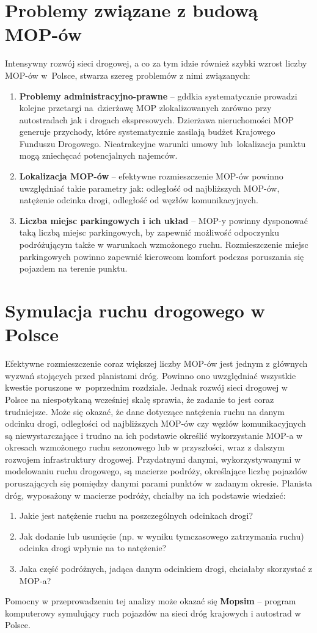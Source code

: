 \section{Problemy związane z budową MOP-ów}
Intensywny rozwój sieci drogowej, a co za tym idzie również szybki wzrost liczby MOP-ów w~Polsce, stwarza szereg problemów z nimi związanych:
\begin{enumerate}
    \item \textbf{Problemy administracyjno-prawne} -- \acrshort{gddkia} systematycznie prowadzi kolejne przetargi na~dzierżawę MOP zlokalizowanych zarówno przy autostradach jak i drogach ekspresowych. Dzierżawa nieruchomości MOP generuje przychody, które systematycznie zasilają budżet Krajowego Funduszu Drogowego. Nieatrakcyjne warunki umowy lub~lokalizacja punktu mogą zniechęcać potencjalnych najemców.
    \item \textbf{Lokalizacja MOP-ów} -- efektywne rozmieszczenie MOP-ów powinno uwzględniać takie parametry jak: odległość od najbliższych MOP-ów, natężenie odcinka drogi, odległość od węzłów komunikacyjnych.
    \item \textbf{Liczba miejsc parkingowych i ich układ} -- MOP-y powinny dysponować taką liczbą miejsc parkingowych, by zapewnić możliwość odpoczynku podróżującym także w warunkach wzmożonego ruchu. Rozmieszczenie miejsc parkingowych powinno zapewnić kierowcom komfort podczas poruszania się pojazdem na terenie punktu.
\end{enumerate}

\section{Symulacja ruchu drogowego w Polsce}
Efektywne rozmieszczenie coraz większej liczby MOP-ów jest jednym z głównych wyzwań stojących przed planistami dróg. Powinno ono uwzględniać wszystkie kwestie poruszone w~poprzednim rozdziale. Jednak rozwój sieci drogowej w Polsce na niespotykaną wcześniej skalę sprawia, że zadanie to jest coraz trudniejsze. Może się okazać, że dane dotyczące natężenia ruchu na danym odcinku drogi, odległości od najbliższych MOP-ów czy węzłów komunikacyjnych są niewystarczające i trudno na ich podstawie określić wykorzystanie MOP-a w okresach wzmożonego ruchu sezonowego lub w przyszłości, wraz z dalszym rozwojem infrastruktury drogowej. Przydatnymi danymi, wykorzystywanymi w modelowaniu ruchu drogowego, są macierze podróży, określające liczbę pojazdów poruszających się pomiędzy danymi parami punktów w zadanym okresie. Planista dróg, wyposażony w macierze podróży, chciałby na ich podstawie wiedzieć:
\begin{enumerate}
	\item Jakie jest natężenie ruchu na poszczególnych odcinkach drogi?
	\item Jak dodanie lub usunięcie (np. w wyniku tymczasowego zatrzymania ruchu) odcinka drogi wpłynie na to natężenie?
	\item Jaka część podróżnych, jadąca danym odcinkiem drogi, chciałaby skorzystać z MOP-a?
\end{enumerate}
Pomocny w przeprowadzeniu tej analizy może okazać się \textbf{Mopsim} -- program komputerowy symulujący ruch pojazdów na
sieci dróg krajowych i autostrad w Polsce.

